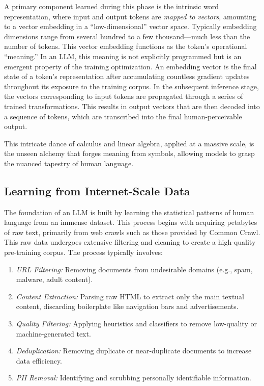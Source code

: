 \documentclass[%
  reprint,
  superscriptaddress,
  showpacs,
  showkeys,
  amsmath,amssymb,
  pra,
  longbibliography,
  floatfix,
  x11names
]{revtex4-2}
\begin{document}
A primary component learned during this phase is the intrinsic word representation,
where input and output tokens are \textit{mapped to vectors}, amounting to a vector  embedding in a ``low-dimensional''
vector space.
Typically embedding dimensions range from several hundred to a few thousand---much less than the number of tokens.
This vector embedding functions as the token's operational ``meaning.''
In an LLM, this meaning is not explicitly programmed but is an emergent property of the training optimization.
An embedding vector is the final state of a token's representation after accumulating countless gradient updates
throughout its exposure to the training corpus.
In the subsequent inference stage, the vectors corresponding to input tokens are propagated through a series of trained transformations.
This results in output vectors that are then decoded into a sequence of tokens,
which are transcribed into the final human-perceivable output.


This intricate dance of calculus and linear algebra,
applied at a massive scale, is the unseen alchemy that forges meaning from symbols,
allowing models to grasp the nuanced tapestry of human language.


\subsection{Learning from Internet-Scale Data}

The foundation of an LLM is built by learning the statistical patterns of human language from an immense dataset.
This process begins with acquiring petabytes of raw text, primarily from web crawls such as those provided by Common Crawl. This raw data undergoes extensive filtering and cleaning to create a high-quality pre-training corpus. The process typically involves:
\begin{enumerate}
    \item \textit{URL Filtering:} Removing documents from undesirable domains (e.g., spam, malware, adult content).
    \item \textit{Content Extraction:} Parsing raw HTML to extract only the main textual content, discarding boilerplate like navigation bars and advertisements.
    \item \textit{Quality Filtering:} Applying heuristics and classifiers to remove low-quality or machine-generated text.
    \item \textit{Deduplication:} Removing duplicate or near-duplicate documents to increase data efficiency.
    \item \textit{PII Removal:} Identifying and scrubbing personally identifiable information.
\end{enumerate}
\end{document}
